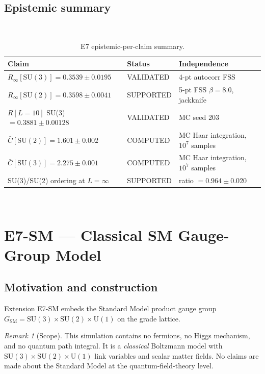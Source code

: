 \documentclass[12pt,a4paper]{article}
\theoremstyle{plain}
\theoremstyle{definition}
\theoremstyle{remark}
\newtheorem{remark}[theorem]{Remark}
\newcommand{\RinfSUtwo}{0.3598 \pm 0.0041}          %
\newcommand{\ChaarsUTwo}{1.601 \pm 0.002}
\newcommand{\RinfSUthree}{0.3539 \pm 0.0195}      %
\newcommand{\ChaarsUThree}{2.275 \pm 0.001}
\newcommand{\RinfRatio}{0.964 \pm 0.020}                      %
\newcommand{\RSUthreeLten}{0.3881 \pm 0.00128}
\begin{document}

\subsection{Epistemic summary}

\begin{table}[htbp]
\caption{E7 epistemic-per-claim summary.}
\label{tab:E7-epistemic}
\
\begin{tabular}{p{5.5cm}ll}
\toprule
Claim & Status & Independence \\
\midrule
$R_\infty[\mathrm{SU}(3)] = \RinfSUthree$ & VALIDATED & 4-pt autocorr FSS \\
$R_\infty[\mathrm{SU}(2)] = \RinfSUtwo$ & SUPPORTED & 5-pt FSS $\beta{=}8.0$, jackknife \\
$R[L=10]$ SU(3) $= \RSUthreeLten$ & VALIDATED & MC seed 203 \\
$\bar{C}[\mathrm{SU}(2)] = \ChaarsUTwo$ & COMPUTED & MC Haar integration, $10^7$ samples \\
$\bar{C}[\mathrm{SU}(3)] = \ChaarsUThree$ & COMPUTED & MC Haar integration, $10^7$ samples \\
SU(3)/SU(2) ordering at $L=\infty$ & SUPPORTED & ratio $= \RinfRatio$ \\

\bottomrule
\end{tabular}
\
\end{table}

\section{E7-SM --- Classical SM Gauge-Group Model}
\label{sec:E7-SM}

\subsection{Motivation and construction}

Extension E7-SM embeds the Standard Model product gauge group
$G_{\mathrm{SM}} = \mathrm{SU}(3)\times\mathrm{SU}(2)\times\mathrm{U}(1)$
on the grade lattice.

\begin{remark}[Scope]
This simulation contains no fermions, no Higgs mechanism, and no quantum
path integral. It is a \emph{classical} Boltzmann model with
$\mathrm{SU}(3)\times\mathrm{SU}(2)\times\mathrm{U}(1)$ link variables
and scalar matter fields. No claims are made about the Standard Model at
the quantum-field-theory level.
\end{remark}
\end{document}
